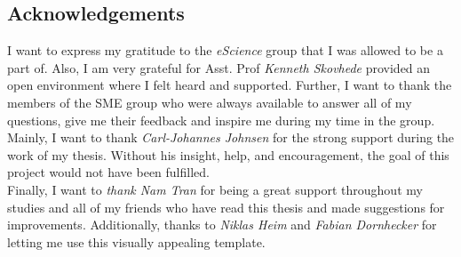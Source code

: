 \begin{vplace}[0.5]
\section*{Acknowledgements}%
\label{sec:acknowledgements}

I want to express my gratitude to the {\em eScience} group that I was allowed to be a part of. Also, I am very grateful for Asst. Prof {\em Kenneth Skovhede} provided an open environment where I felt heard and supported. Further, I want to thank the members of the SME group who were always available to answer all of my questions, give me their feedback and inspire me during my time in the group. 
\\

Mainly, I want to thank {\em Carl-Johannes Johnsen} for the strong support during the work of my thesis. Without his insight, help, and encouragement, the goal of this project would not have been fulfilled.\\

Finally, I want to {\em thank Nam Tran} for being a great support throughout my studies and all of my friends who have read this thesis and made suggestions for improvements. Additionally, thanks to {\em Niklas Heim} and {\em Fabian Dornhecker} for letting me use this visually appealing template. 

\end{vplace}
